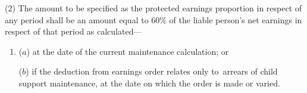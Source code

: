 \documentclass[12pt,a4paper]{article}
\begin{document}
(2) The amount to be specified as the 
protected earnings proportion  %
in respect of any period shall
be an amount equal to
60\% of the liable person’s net earnings  %
in respect of that period 
as calculated—
\begin{enumerate}\item[]
    ($a$) 
    at the date of the current maintenance calculation; or

    ($b$) 
    if the deduction from earnings order relates only to~arrears of child support maintenance, at the date on which the order is made or varied.
\end{enumerate}  %

%
%
%
%
\end{document}
